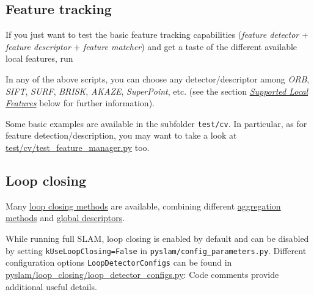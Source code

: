\documentclass{article}
\newenvironment{Shaded}{\begin{snugshade}}{\end{snugshade}}
\newcommand{\BuiltInTok}[1]{\textcolor[rgb]{0.74,0.68,0.62}{#1}}
\newcommand{\CommentTok}[1]{\textcolor[rgb]{0.00,0.40,1.00}{\textbf{\textit{#1}}}}
\newcommand{\ExtensionTok}[1]{\textcolor[rgb]{0.74,0.68,0.62}{#1}}
\newcommand{\NormalTok}[1]{\textcolor[rgb]{0.74,0.68,0.62}{#1}}
\begin{document}
\hypertarget{feature-tracking}{%
\subsection{Feature tracking}\label{feature-tracking}}

If you just want to test the basic feature tracking capabilities
(\emph{feature detector} + \emph{feature descriptor} + \emph{feature
matcher}) and get a taste of the different available local features, run \\

\begin{scriptsize}
\begin{Shaded}
\end{Shaded}
\end{scriptsize}


In any of the above scripts, you can choose any detector/descriptor
among \emph{ORB}, \emph{SIFT}, \emph{SURF}, \emph{BRISK}, \emph{AKAZE},
\emph{SuperPoint}, etc. (see the section
\emph{\protect\hyperlink{supported-local-features}{Supported Local
Features}} below for further information).

Some basic examples are available in the subfolder
\texttt{test/cv}. In particular, as for feature
detection/description, you may want to take a look at
\href{https://github.com/luigifreda/pyslam/blob/master/test/cv/test_feature_manager.py}{test/cv/test\_feature\_manager.py}
too.

\hypertarget{loop-closing}{%
\subsection{Loop closing}\label{loop-closing}}

Many \protect\hyperlink{loop-closing}{loop closing methods} are
available, combining different
\protect\hyperlink{local-descriptor-aggregation-methods}{aggregation
methods} and \protect\hyperlink{global-descriptors}{global descriptors}.

While running full SLAM, loop closing is enabled by default and can be
disabled by setting \texttt{kUseLoopClosing=False} in
\texttt{pyslam/config\_parameters.py}. Different configuration options
\texttt{LoopDetectorConfigs} can be found in
\href{https://github.com/luigifreda/pyslam/blob/master/pyslam/loop_closing/loop_detector_configs.py}{pyslam/loop\_closing/loop\_detector\_configs.py}: Code comments provide additional useful details.
\end{document}
